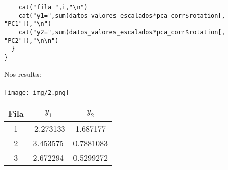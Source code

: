 \begin{sol}
\begin{verbatim}
    cat("fila ",i,"\n")
    cat("y1=",sum(datos_valores_escalados*pca_corr$rotation[, "PC1"]),"\n")
    cat("y2=",sum(datos_valores_escalados*pca_corr$rotation[, "PC2"]),"\n\n")
  }
}
\end{verbatim}
Nos resulta:\\\\
\texttt{[image: img/2.png]}\\
\begin{table}[ht]
    \centering
    \begin{tabular}{|c|c|c|}
        \hline
        \textbf{Fila} & $y_1$ & $y_2$ \\
        \hline
        1 & -2.273133 & 1.687177 \\
        2 & 3.453575 & 0.7881083 \\
        3 & 2.672294 & 0.5299272 \\
        \hline
    \end{tabular}
\end{table}


\end{sol}
